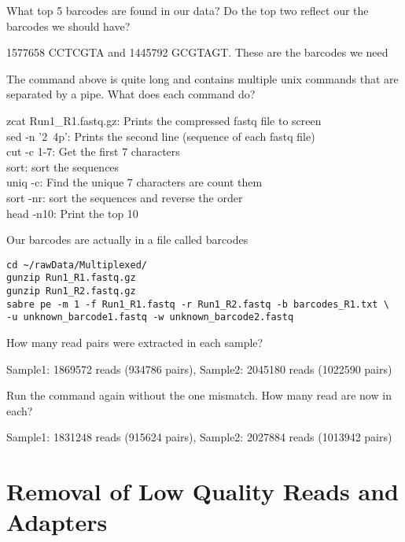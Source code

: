 \begin{questions}
What top 5 barcodes are found in our data? Do the top two reflect our the barcodes we should have?\\
\begin{answer}
1577658 CCTCGTA and 1445792 GCGTAGT. These are the barcodes we need
\end{answer}
The command above is quite long and contains multiple unix commands that are separated by a pipe. What does each command do?
\begin{answer}
zcat Run1\_R1.fastq.gz: Prints the compressed fastq file to screen \\
sed -n '2~4p': Prints the second line (sequence of each fastq file) \\
cut -c 1-7: Get the first 7 characters \\
sort: sort the sequences \\
uniq -c: Find the unique 7 characters are count them \\
sort -nr: sort the sequences and reverse the order \\
head -n10: Print the top 10 \\
\end{answer}
\end{questions}

\begin{steps}
Our barcodes are actually in a file called barcodes
\begin{lstlisting}
cd ~/rawData/Multiplexed/
gunzip Run1_R1.fastq.gz
gunzip Run1_R2.fastq.gz
sabre pe -m 1 -f Run1_R1.fastq -r Run1_R2.fastq -b barcodes_R1.txt \
-u unknown_barcode1.fastq -w unknown_barcode2.fastq
\end{lstlisting}
\end{steps}

\begin{questions}
How many read pairs were extracted in each sample? \\
\begin{answer}
Sample1: 1869572 reads (934786 pairs), Sample2: 2045180 reads (1022590 pairs)
\end{answer}
Run the command again without the one mismatch. How many read are now in each? \\
\begin{answer}
Sample1: 1831248 reads (915624 pairs), Sample2: 2027884 reads (1013942 pairs)
\end{answer}
\end{questions}

\section{Removal of Low Quality Reads and Adapters}

